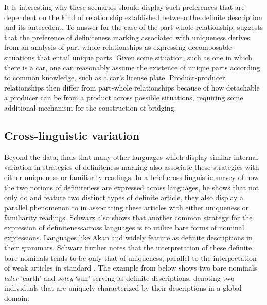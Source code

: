 \documentclass[output=paper,modfonts,nonflat]{langsci/langscibook}
\begin{document}
It is interesting why these scenarios should display such preferences that are dependent on the kind of relationship established between the definite description and its antecedent.  To answer for the case of the part-whole relationship, \citet{Schwarz2009} suggests that the preference of definiteness marking associated with uniqueness derives from an analysis of part-whole relationships as expressing decomposable situations that entail unique parts.  Given some situation, such as one in which there is a car, one can reasonably assume the existence of unique parts according to common knowledge, such as a car's license plate.  Product-producer relationships then differ from part-whole relationships because of how detachable a producer can be from a product across possible situations, requiring some additional mechanism for the construction of bridging. 

\subsection{Cross-linguistic variation} \label{sec:cisneros:2.4}

Beyond the  data, \citet{Schwarz2013} finds that many other languages which display similar internal variation in strategies of definiteness marking also associate these strategies with either uniqueness or familiarity readings.  In a brief cross-linguistic survey of how the two notions of definiteness are expressed across languages, he shows that not only do  and  feature two distinct types of definite article, they also display a parallel phenomenon to  in associating these articles with either uniqueness or familiarity readings.  Schwarz also shows that another common strategy for the expression of definiteness\linebreak across languages is to utilize bare forms of nominal expressions.  Languages like Akan and  widely feature  as definite descriptions in their grammars.  Schwarz further notes that the interpretation of these definite bare nominals tends to be only that of uniqueness, parallel to the interpretation of weak articles in standard .  The example from  below shows two bare nominals \textit{later} `earth' and \textit{soley} `sun' serving as definite descriptions, denoting two individuals that are uniquely characterized by their descriptions in a global domain.
\end{document}
